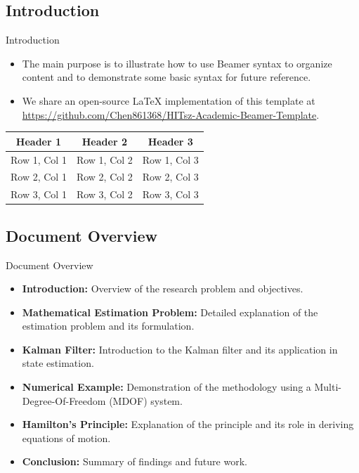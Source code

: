\documentclass{beamer}
\begin{document}
\subsection{Introduction}
\begin{frame}{Introduction}
  \begin{itemize}
    \item  The main purpose is to illustrate how to use Beamer syntax to organize content and to demonstrate some basic syntax for future reference.
    \item  We share an open-source LaTeX implementation of this template at \href{https://github.com/Chen861368/HITsz-Academic-Beamer-Template}{https://github.com/Chen861368/HITsz-Academic-Beamer-Template}.
\end{itemize}
 
  \vspace{10pt}

  \begin{table}[ht]
    \centering
    \begin{tabular}{|c|c|c|}
      \hline
      \textbf{Header 1} & \textbf{Header 2} & \textbf{Header 3} \\
      \hline
      Row 1, Col 1 & Row 1, Col 2 & Row 1, Col 3 \\
      \hline
      Row 2, Col 1 & Row 2, Col 2 & Row 2, Col 3 \\
      \hline
      Row 3, Col 1 & Row 3, Col 2 & Row 3, Col 3 \\
      \hline
    \end{tabular}
  \end{table}

\end{frame}

\subsection{Document Overview}
\begin{frame}{Document Overview}
  \begin{itemize}
      \item \textbf{Introduction:} Overview of the research problem and objectives.
      \item \textbf{Mathematical Estimation Problem:} Detailed explanation of the estimation problem and its formulation.
      \item \textbf{Kalman Filter:} Introduction to the Kalman filter and its application in state estimation.
      \item \textbf{Numerical Example:} Demonstration of the methodology using a Multi-Degree-Of-Freedom (MDOF) system.
      \item \textbf{Hamilton's Principle:} Explanation of the principle and its role in deriving equations of motion.
      \item \textbf{Conclusion:} Summary of findings and future work.
  \end{itemize}
\end{frame}
\end{document}
